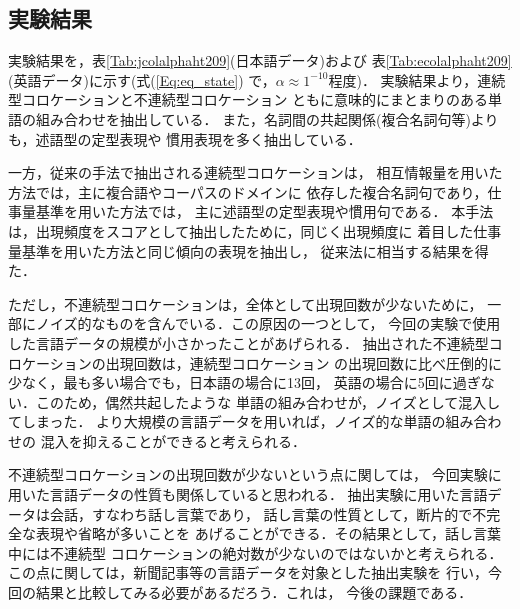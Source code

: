 \subsection{実験結果}

実験結果を，表\ref{Tab:jcolalphaht209}(日本語データ)および
表\ref{Tab:ecolalphaht209}(英語データ)に示す(式(\ref{Eq:eq_state})
で，$\alpha\approx 1^{-10}$程度)．
実験結果より，連続型コロケーションと不連続型コロケーション
ともに意味的にまとまりのある単語の組み合わせを抽出している．
また，名詞間の共起関係(複合名詞句等)よりも，述語型の定型表現や
慣用表現を多く抽出している．

一方，従来の手法で抽出される連続型コロケーションは，
相互情報量を用いた方法では，主に複合語やコーパスのドメインに
依存した複合名詞句であり，仕事量基準を用いた方法では，
主に述語型の定型表現や慣用句である\cite{Kita94a,Kita94b}．
本手法は，出現頻度をスコアとして抽出したために，同じく出現頻度に
着目した仕事量基準を用いた方法と同じ傾向の表現を抽出し，
従来法に相当する結果を得た．

ただし，不連続型コロケーションは，全体として出現回数が少ないために，
一部にノイズ的なものを含んでいる．この原因の一つとして，
今回の実験で使用した言語データの規模が小さかったことがあげられる．
抽出された不連続型コロケーションの出現回数は，連続型コロケーション
の出現回数に比べ圧倒的に少なく，最も多い場合でも，日本語の場合に13回，
英語の場合に5回に過ぎない．このため，偶然共起したような
単語の組み合わせが，ノイズとして混入してしまった．
より大規模の言語データを用いれば，ノイズ的な単語の組み合わせの
混入を抑えることができると考えられる．

不連続型コロケーションの出現回数が少ないという点に関しては，
今回実験に用いた言語データの性質も関係していると思われる．
抽出実験に用いた言語データは会話，すなわち話し言葉であり，
話し言葉の性質として，断片的で不完全な表現や省略が多いことを
あげることができる．その結果として，話し言葉中には不連続型
コロケーションの絶対数が少ないのではないかと考えられる．
この点に関しては，新聞記事等の言語データを対象とした抽出実験を
行い，今回の結果と比較してみる必要があるだろう．これは，
今後の課題である．

